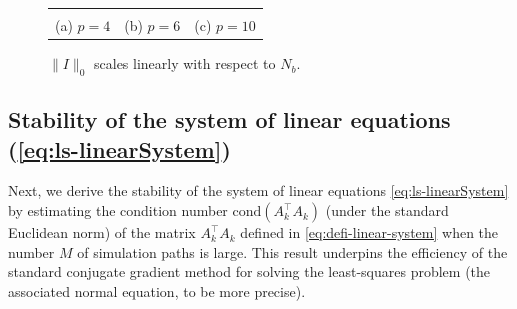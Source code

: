 \documentclass[10pt,a4paper]{amsart}
\numberwithin{equation}{section}
\numberwithin{algorithm}{section}
\theoremstyle{plain}
\theoremstyle{remark}
\begin{document}
\begin{figure}[htbp]
    \centering
    \begin{tabular}{ccc}
    
    &%
    
    &
    \\
    (a) $p=4$ & (b) $p=6$ & (c) $p=10$
    \end{tabular}
    \caption{$\|I\|_0$ scales linearly with respect to $N_b$.}
    \label{fig: hc_nnz}
\end{figure}


\subsection{Stability of the system of linear equations (\ref*{eq:ls-linearSystem})}
Next, we derive the stability of the system of linear equations \eqref{eq:ls-linearSystem} by estimating the condition number $\mathrm{cond}(A_k^\top A_k)$ (under the standard Euclidean norm) of the matrix $A_k^\top A_k$ defined in \eqref{eq:defi-linear-system} when the number $M$ of simulation paths is large. This result underpins the efficiency of the standard conjugate gradient method \cite{Hestenes:1952} for solving the least-squares problem (the associated normal equation, to be more precise).
\end{document}
